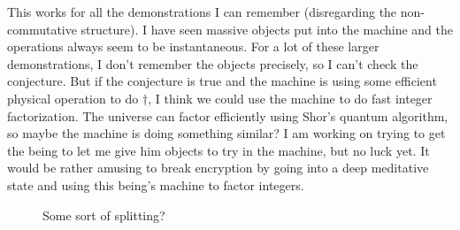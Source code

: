 \documentclass[12pt]{article}
\newcommand{\fancy}[1]{\mathcal{#1}}
\newcommand{\C}[1]{\fancy{C}_{#1}}
\def\C{\fancy{C}}
\newcommand{\Bond}[6]%
{ \begin{pgfonlayer}{background}
        \colorlet{InColor}{#4}
        \colorlet{OutColor}{#5}
        \foreach \I in {#6,...,1}
        {   \pgfmathsetlengthmacro{\r}{#3/#6*\I}
            \pgfmathsetmacro{\C}{sqrt(1-\r*\r/#3/#3)*100}
            \draw[InColor!\C!OutColor, line width=\r] (#1.center) -- (#2.center);
        }
    \end{pgfonlayer}
}
\newcommand{\BlackBond}[2]%
{   \Bond{#1}{#2}{0.7071mm}{black!25}{black!25!black}{10}
}
\begin{document}
This works for all the demonstrations I can remember (disregarding the non-commutative structure).   I have seen massive objects put into the machine and the operations always seem to be instantaneous.  For a lot of these
larger demonstrations, I don't remember the objects precisely, so I can't check the conjecture.  But if the conjecture is true and the machine is using some efficient physical operation to do $\dagger$, I think we could
use the machine to do fast integer factorization.  The universe can factor efficiently using Shor's quantum algorithm, so maybe the machine is doing something similar?   I am working on trying to get the being to let me give 
him objects to try in the machine, but no luck yet.  It would be rather amusing to break encryption by going into a deep meditative state and using this being's machine to factor integers.

\begin{figure}\label{ManyFromFew}
\centering
{}
\caption{Some sort of splitting?}
\end{figure}
\end{document}
